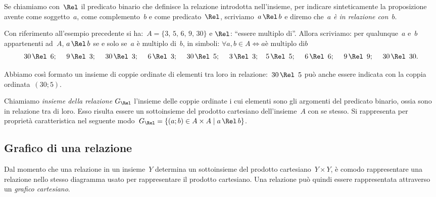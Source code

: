 \ovalbox{\risolvi \ref{ese:\thechapter.2}}\vspazio

Se chiamiamo con~$\Rel$ il predicato binario che definisce la relazione introdotta nell'insieme, per indicare 
sinteticamente la proposizione avente come soggetto~$a$, come complemento~$b$ e come predicato~$\Rel$, scriviamo~$a \,\Rel\, b$ e
diremo che~\emph{$a$ è in relazione con~$b$}.

\begin{exrig}
 \begin{esempio}

Con riferimento all'esempio precedente si ha:~$A = \{3\text{,~}5\text{,~}6\text{,~}9\text{,~}30\}$ e $\Rel$:
``essere multiplo di''. Allora scriviamo: per qualunque~$a$ e~$b$ appartenenti ad~$A$,
$a \,\Rel\, b$ se e solo se~$a$ è multiplo di~$b$, in simboli: $\forall a,b \in A \Leftrightarrow a \text{è multiplo di} b$
\[30 \,\Rel\,~6;\quad~9 \,\Rel\,~3;\quad~30 \,\Rel\,~3;\quad~6 \,\Rel\,~3;\quad~30 \,\Rel\,~5;\quad~3 \,\Rel\,~3;\quad 5 \,\Rel\,~5;\quad~6 \,\Rel\,~6;\quad~9 \,\Rel\,~9;\quad~30 \,\Rel\,~30.\]

Abbiamo così formato un insieme di coppie ordinate di elementi tra loro in relazione:~$30 \,\Rel\,~5$ può anche essere indicata con la coppia ordinata~$(30;5)$.
\end{esempio}
\end{exrig}

\begin{definizione}
Chiamiamo \emph{insieme della relazione} $G_\Rel$ l'insieme delle coppie ordinate i cui
elementi sono gli argomenti del predicato binario, ossia sono in relazione tra di loro. Esso risulta essere un
sottoinsieme del prodotto cartesiano dell'insieme~$A$ con se stesso. Si rappresenta per proprietà caratteristica nel
seguente modo~$G_\Rel = \{(a;b) \in A \times A \mid  a \,\Rel\, b \}$.
\end{definizione}

\ovalbox{\risolvii \ref{ese:\thechapter.3}, \ref{ese:\thechapter.4}, \ref{ese:\thechapter.5}, \ref{ese:\thechapter.6}}
\subsection{Grafico di una relazione}

Dal momento che una relazione in un insieme~$Y$ determina un sottoinsieme del prodotto cartesiano~$Y \times Y$, è
comodo rappresentare una relazione nello stesso diagramma usato per rappresentare il prodotto cartesiano.
Una relazione può quindi essere rappresentata attraverso un \emph{grafico cartesiano}.

